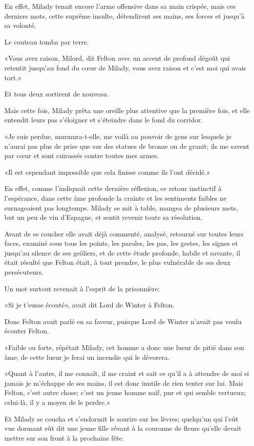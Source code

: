 En effet, Milady tenait encore l'arme offensive dans sa main crispée, mais ces derniers mots, cette suprême insulte, détendirent ses mains, ses forces et jusqu'à sa volonté. 

Le couteau tomba par terre. 

«Vous avez raison, Milord, dit Felton avec un accent de profond dégoût qui retentit jusqu'au fond du cœur de Milady, vous avez raison et c'est moi qui avais tort.» 

Et tous deux sortirent de nouveau. 

Mais cette fois, Milady prêta une oreille plus attentive que la première fois, et elle entendit leurs pas s'éloigner et s'éteindre dans le fond du corridor. 

«Je suis perdue, murmura-t-elle, me voilà au pouvoir de gens sur lesquels je n'aurai pas plus de prise que sur des statues de bronze ou de granit; ils me savent par cœur et sont cuirassés contre toutes mes armes. 

«Il est cependant impossible que cela finisse comme ils l'ont décidé.» 

En effet, comme l'indiquait cette dernière réflexion, ce retour instinctif à l'espérance, dans cette âme profonde la crainte et les sentiments faibles ne surnageaient pas longtemps. Milady se mit à table, mangea de plusieurs mets, but un peu de vin d'Espagne, et sentit revenir toute sa résolution. 

Avant de se coucher elle avait déjà commenté, analysé, retourné sur toutes leurs faces, examiné sous tous les points, les paroles, les pas, les gestes, les signes et jusqu'au silence de ses geôliers, et de cette étude profonde, habile et savante, il était résulté que Felton était, à tout prendre, le plus vulnérable de ses deux persécuteurs. 

Un mot surtout revenait à l'esprit de la prisonnière: 

«Si je t'eusse écouté», avait dit Lord de Winter à Felton. 

Donc Felton avait parlé en sa faveur, puisque Lord de Winter n'avait pas voulu écouter Felton. 

«Faible ou forte, répétait Milady, cet homme a donc une lueur de pitié dans son âme; de cette lueur je ferai un incendie qui le dévorera. 

«Quant à l'autre, il me connaît, il me craint et sait ce qu'il a à attendre de moi si jamais je m'échappe de ses mains, il est donc inutile de rien tenter sur lui. Mais Felton, c'est autre chose; c'est un jeune homme naïf, pur et qui semble vertueux; celui-là, il y a moyen de le perdre.» 

Et Milady se coucha et s'endormit le sourire sur les lèvres; quelqu'un qui l'eût vue dormant eût dit une jeune fille rêvant à la couronne de fleurs qu'elle devait mettre sur son front à la prochaine fête. 